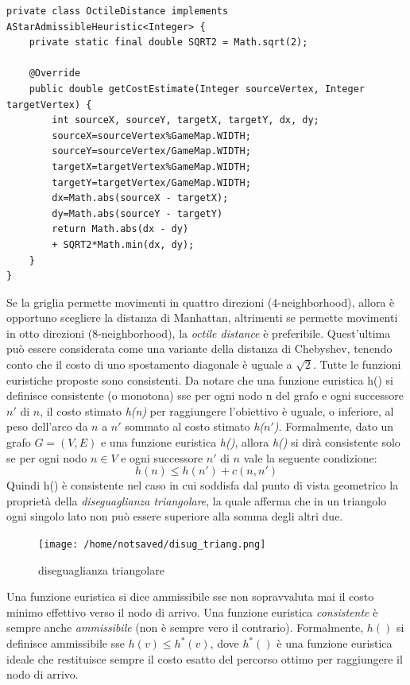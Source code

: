 \documentclass[11pt]{book}
\begin{document}
\lstset{style=customjava, label=lstOctile, caption=octile distance}
\begin{lstlisting}
private class OctileDistance implements AStarAdmissibleHeuristic<Integer> {
	private static final double SQRT2 = Math.sqrt(2);
	
    @Override
    public double getCostEstimate(Integer sourceVertex, Integer targetVertex) {
        int sourceX, sourceY, targetX, targetY, dx, dy;
        sourceX=sourceVertex%GameMap.WIDTH;
        sourceY=sourceVertex/GameMap.WIDTH;
        targetX=targetVertex%GameMap.WIDTH;
        targetY=targetVertex/GameMap.WIDTH;
        dx=Math.abs(sourceX - targetX);
        dy=Math.abs(sourceY - targetY)
        return Math.abs(dx - dy) 
        + SQRT2*Math.min(dx, dy);
    }
}
\end{lstlisting}
\fi
\par{Se la griglia permette movimenti in quattro direzioni (4-neighborhood), allora \`e opportuno scegliere la distanza di Manhattan, altrimenti se permette movimenti in otto direzioni (8-neighborhood), la \emph{octile distance} \`e preferibile. Quest'ultima pu\`o essere considerata come una variante della distanza di Chebyshev, tenendo conto che il costo di uno spostamento diagonale \`e uguale a $\sqrt{2}$. Tutte le funzioni euristiche proposte sono consistenti. Da notare che una funzione euristica h() si definisce consistente (o monotona) sse per ogni nodo n del grafo e ogni successore $n'$ di $n$, il costo stimato \emph{h(n)} per raggiungere l'obiettivo \`e uguale, o inferiore, al peso dell'arco da $n$ a $n'$ sommato al costo stimato \emph{h($n'$)}. Formalmente, dato un grafo $G = (V, E)$ e una funzione euristica \emph{h()}, allora \emph{h()} si dir\`a consistente solo se per ogni nodo $n \in V$ e ogni successore $n'$ di $n$ vale la seguente condizione: $$ h(n) \leq h(n') + c(n, n') $$
Quindi h() \`e consistente nel caso in cui soddisfa dal punto di vista geometrico la propriet\`a della \emph{diseguaglianza triangolare}, la quale afferma che in un triangolo ogni singolo lato non pu\`o essere superiore alla somma degli altri due.}
\begin{figure}[htp]
\centering
\texttt{[image: /home/notsaved/disug\_triang.png]}
\caption{diseguaglianza triangolare }
\label{img4}
\end{figure}
\par{Una funzione euristica si dice ammissibile sse non sopravvaluta mai il costo minimo effettivo verso il nodo di arrivo. Una funzione euristica \emph{consistente} \`e sempre anche \emph{ammissibile} (non \`e sempre vero il contrario). Formalmente, $h()$ si definisce ammissibile sse $ h(v) \leq h^*(v)$, dove $h^*()$ \`e una funzione euristica ideale che restituisce sempre il costo esatto del percorso ottimo per raggiungere il nodo di arrivo. }
\end{document}
